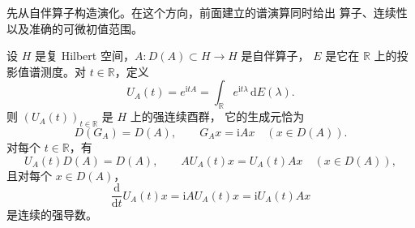 先从自伴算子构造演化。在这个方向，前面建立的谱演算同时给出
算子、连续性以及准确的可微初值范围。

\begin{proposition}[自伴算子的指数群]
\label{b1:prop:29-spectral-unitary-group}
设 \(H\) 是复 Hilbert 空间，\(A:D(A)\subset H\to H\) 是自伴算子，
\(E\) 是它在 \(\mathbb R\) 上的投影值谱测度。对 \(t\in\mathbb R\)，定义
\begin{equation}\label{b1:eq:29-unitary-spectral-integral}
 U_A(t)=e^{\mathrm itA}
       =\int_{\mathbb R}e^{\mathrm it\lambda}\,\mathrm dE(\lambda).
\end{equation}
则 \((U_A(t))_{t\in\mathbb R}\) 是 \(H\) 上的强连续酉群，
它的生成元恰为
\[
 D(G_A)=D(A),\qquad G_Ax=\mathrm iAx\quad(x\in D(A)).
\]
对每个 \(t\in\mathbb R\)，有
\[
 U_A(t)D(A)=D(A),\qquad AU_A(t)x=U_A(t)Ax\quad(x\in D(A)),
\]
且对每个 \(x\in D(A)\)，
\[
 \frac{\mathrm d}{\mathrm dt}U_A(t)x
 =\mathrm iAU_A(t)x=\mathrm iU_A(t)Ax
\]
是连续的强导数。
\end{proposition}

